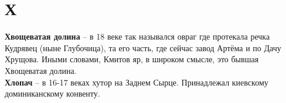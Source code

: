 \chapter*{Х}

\textbf{Хвощеватая долина} – в 18 веке так назывался овраг где протекала речка Кудрявец (ныне Глубочица), та его часть, где сейчас завод Артёма и по Дачу Хрущова. Иными словами, Кмитов яр, в широком смысле, это бывшая Хвощеватая долина.\\

\textbf{Хлопач} – в 16-17 веках хутор на Заднем Сырце. Принадлежал киевскому доминиканскому конвенту.